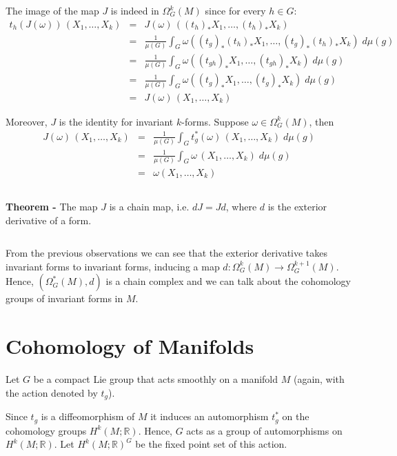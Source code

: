 \documentclass[12pt]{article}
\begin{document}
The image of the map $J$ is indeed in $\Omega_G^k(M)$ since for every $h \in G$:
\begin{eqnarray*}
t_h(J(\omega))\,(X_1, \dots, X_k) & = & J(\omega)\,((t_h)_*X_1, \dots, (t_h)_*X_k)\\
& = & \frac{1}{\mu(G)}\int_G \omega((t_g)_*(t_h)_*X_1, \dots, (t_g)_*(t_h)_*X_k)\;d\mu(g)\\
& = & \frac{1}{\mu(G)}\int_G \omega((t_{gh})_*X_1, \dots, (t_{gh})_*X_k)\;d\mu(g)\\
& = & \frac{1}{\mu(G)}\int_G \omega((t_g)_*X_1, \dots, (t_g)_*X_k)\;d\mu(g)\\
& = & J(\omega)\,(X_1, \dots, X_k)
\end{eqnarray*}

Moreover, $J$ is the identity for invariant $k$-forms. Suppose $\omega \in \Omega_G^k(M)$, then
\begin{eqnarray*}
J(\omega)\,(X_1, \dots, X_k) & = & \frac{1}{\mu(G)}\int_G t_g^*(\omega)\,(X_1, \dots, X_k)\;d\mu(g)\\
& = & \frac{1}{\mu(G)}\int_G \omega\,(X_1, \dots, X_k)\;d\mu(g)\\
& = & \omega(X_1, \dots, X_k)
\end{eqnarray*}

$\,$

{\bf Theorem -} The map $J$ is a chain map, i.e. $dJ = Jd$, where $d$ is the exterior derivative of a form.

$\,$

From the previous observations we can see that the exterior derivative takes invariant forms to invariant forms, inducing a map $d:\Omega_G^k(M) \longrightarrow \Omega_G^{k+1}(M)$. Hence, $(\Omega_G^*(M), d)$ is a chain complex and we can talk about the cohomology groups of invariant forms in $M$.

\section{Cohomology of Manifolds}

Let $G$ be a compact Lie group that acts smoothly on a manifold $M$ (again, with the action denoted by $t_g$).

Since $t_g$ is a diffeomorphism of $M$ it induces an automorphism $t_g^*$ on the cohomology groups $H^k(M;\mathbb{R})$. Hence, $G$ acts as a group of automorphisms on $H^k(M; \mathbb{R})$. Let $H^k(M; \mathbb{R})^G$ be the fixed point set of this action.

$\,$
\end{document}
